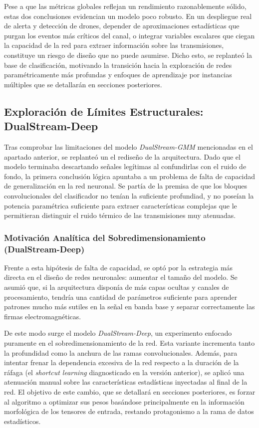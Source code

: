 Pese a que las métricas globales reflejan un rendimiento razonablemente sólido, estas dos conclusiones evidencian un modelo poco robusto. En un despliegue real de alerta y detección de drones, depender de aproximaciones estadísticas que purgan los eventos más críticos del canal, o integrar variables escalares que ciegan la capacidad de la red para extraer información sobre las transmisiones, constituye un riesgo de diseño que no puede asumirse. Dicho esto, se replanteó la base de clasificación, motivando la transición hacia la exploración de redes paramétricamente más profundas y enfoques de aprendizaje por instancias múltiples que se detallarán en secciones posteriores.

\subsection{Exploración de Límites Estructurales: DualStream-Deep }
\label{subsec:dualstream_deep}

Tras comprobar las limitaciones del modelo \textit{DualStream-GMM} mencionadas en el apartado anterior, se replanteó un el rediseño de la arquitectura. Dado que el modelo terminaba descartando señales legítimas al confundirlas con el ruido de fondo, la primera conclusión lógica apuntaba a un problema de falta de capacidad de generalización en la red neuronal. Se partía de la premisa de que los bloques convolucionales del clasificador no tenían la suficiente profundiad, y no poseían la potencia paramétrica suficiente para extraer características complejas que le permitieran distinguir el ruido térmico de las transmisiones muy atenuadas.

\subsubsection{Motivación Analítica del Sobredimensionamiento (DualStream-Deep)}
Frente a esta hipótesis de falta de capacidad, se optó por la estrategia más directa en el diseño de redes neuronales: aumentar el tamaño del modelo. Se asumió que, si la arquitectura disponía de más capas ocultas y canales de procesamiento, tendría una cantidad de parámetros suficiente para aprender patrones mucho más sutiles en la señal en banda base y separar correctamente las firmas electromagnéticas.

De este modo surge el modelo \textit{DualStream-Deep}, un experimento enfocado puramente en el sobredimensionamiento de la red. Esta variante incrementa tanto la profundidad como la anchura de las ramas convolucionales. Además, para intentar frenar la dependencia excesiva de la red respecto a la duración de la ráfaga (el \textit{shortcut learning} diagnosticado en la versión anterior), se aplicó una atenuación manual sobre las características estadísticas inyectadas al final de la red. El objetivo de este cambio, que se detallará en secciones posteriores, es forzar al algoritmo a optimizar sus pesos basándose principalmente en la información morfológica de los tensores de entrada, restando protagonismo a la rama de datos estadísticos.

